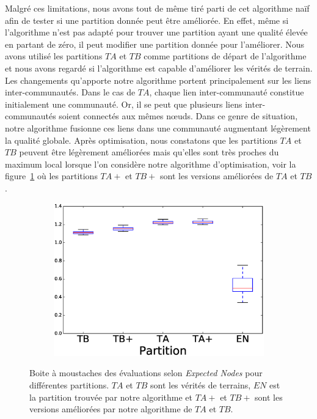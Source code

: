 Malgré ces limitations, nous avons tout de même tiré parti de cet algorithme naïf afin de tester si une partition donnée peut être améliorée.
En effet, même si l'algorithme n'est pas adapté pour trouver une partition ayant une qualité élevée en partant de zéro, il peut modifier une partition donnée pour l'améliorer. 
Nous avons utilisé les partitions $TA$ et $TB$ comme partitions de départ de l'algorithme et nous avons regardé si l'algorithme est capable d'améliorer les vérités de terrain.
Les changements qu'apporte notre algorithme portent principalement sur les liens inter-communautés.
Dans le cas de $TA$, chaque lien inter-communauté constitue initialement une communauté.
Or, il se peut que plusieurs liens inter-communautés soient connectés aux mêmes n\oe{}uds.
Dans ce genre de situation, notre algorithme fusionne ces liens dans une communauté augmentant légèrement la qualité globale.
Après optimisation, nous constatons que les partitions $TA$ et $TB$ peuvent être légèrement améliorées mais qu'elles sont très proches du maximum local lorsque l'on considère notre algorithme d'optimisation,
voir la figure~\ref{fig:LF_bis_EN} où les partitions $TA+$ et $TB+$ sont les versions améliorées de $TA$ et $TB$.
\begin{figure}
\centering
	\begin{subfigure}{0.31\textwidth}
		\includegraphics[width=\linewidth]{img/ExpectedNodes/LF/LFR1_Modified_ALL.eps}
	\end{subfigure}
	
	\caption{Boite à moustaches des évaluations selon \emph{Expected Nodes} pour différentes partitions.
	$TA$ et $TB$ sont les vérités de terrains, $EN$ est la partition trouvée par notre algorithme et $TA+$ et $TB+$ sont les versions améliorées par notre algorithme de $TA$ et $TB$.
	}
	\label{fig:LF_bis_EN}
\end{figure}

